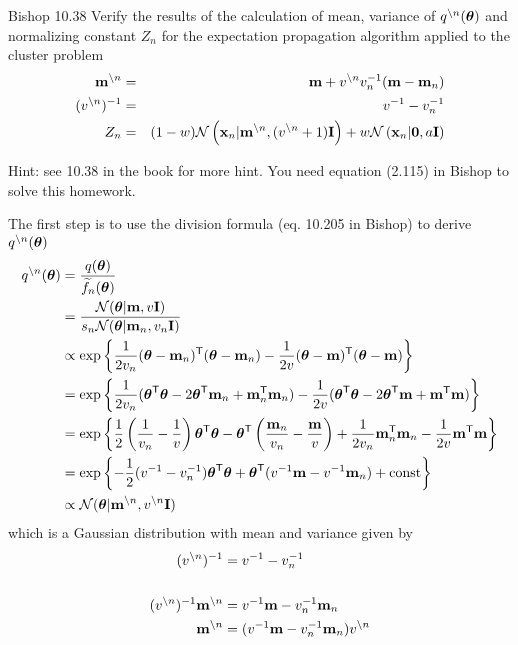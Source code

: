 \documentclass{amsmlaj}
\begin{document}
\begin{extraproblem}\textsf{Bishop 10.38}
Verify the results of the calculation of mean, variance of $q^{\backslash n}(\bm{\mathbf{\theta}})$ and normalizing constant $Z_n$ for the expectation propagation algorithm applied to the cluster problem
\begin{eqnarray}
\bm{\mathbf{m}}^{\backslash n} & = & \bm{\mathbf{m}} + v^{\backslash n}v_n^{-1}(\bm{\mathbf{m}}-\bm{\mathbf{m}}_n)\\
(v^{\backslash n})^{-1} & = & v^{-1} - v_n^{-1}\\
Z_n & = & (1-w)\mathcal{N}\left(\bm{\mathbf{x}}_n|\bm{\mathbf{m}}^{\backslash n}, (v^{\backslash n}+1)\bm{\mathbf{I}}\right) + w\mathcal{N}\left(\bm{\mathbf{x}}_n|\bm{\mathbf{0}},a\bm{\mathbf{I}}\right)
\end{eqnarray}

Hint: see 10.38 in the book for more hint. You need equation (2.115) in Bishop to solve this homework.

\begin{sol}
	The first step is to use the division formula (eq. 10.205 in Bishop) to derive
	$q^{\setminus n}(\bm{\mathbf{\theta}})$
	\begin{align}
		q^{\setminus n}(\bm{\mathbf{\theta}})
		&=\frac{q(\bm{\mathbf{\theta}})}{\widetilde{f}_n(\bm{\mathbf{\theta}})} \\
		&=\frac{\mathcal{N}(\bm{\mathbf{\theta}}|\bm{\mathbf{m}},v\bm{\mathbf{I}})}{s_n\mathcal{N}(\bm{\mathbf{\theta}}|\bm{\mathbf{m}}_n,v_n\bm{\mathbf{I}})} \\
		&\propto \exp \left\{
			\frac{1}{2v_n}(\bm{\mathbf{\theta}}-\bm{\mathbf{m}}_n)^{\mathsf{T}}(\bm{\mathbf{\theta}}-\bm{\mathbf{m}}_n)
			-\frac{1}{2v}(\bm{\mathbf{\theta}}-\bm{\mathbf{m}})^{\mathsf{T}}(\bm{\mathbf{\theta}}-\bm{\mathbf{m}})
		\right\} \\
		&= \exp \left\{
			\frac{1}{2v_n}(\bm{\mathbf{\theta}}^{\mathsf{T}}\bm{\mathbf{\theta}}-2\bm{\mathbf{\theta}}^{\mathsf{T}}\bm{\mathbf{m}}_n+\bm{\mathbf{m}}_n^{\mathsf{T}}\bm{\mathbf{m}}_n)
			-\frac{1}{2v}(\bm{\mathbf{\theta}}^{\mathsf{T}}\bm{\mathbf{\theta}}-2\bm{\mathbf{\theta}}^{\mathsf{T}}\bm{\mathbf{m}}+\bm{\mathbf{m}}^{\mathsf{T}}\bm{\mathbf{m}})
		\right\} \\
		&= \exp \left\{
			\frac{1}{2}\left(\frac{1}{v_n}-\frac{1}{v}\right)\bm{\mathbf{\theta}}^{\mathsf{T}}\bm{\mathbf{\theta}}
			-\bm{\mathbf{\theta}}^{\mathsf{T}}\left( \frac{\bm{\mathbf{m}}_n}{v_n}-\frac{\bm{\mathbf{m}}}{v} \right)
			+\frac{1}{2v_n}\bm{\mathbf{m}}_n^{\mathsf{T}}\bm{\mathbf{m}}_n
			-\frac{1}{2v}\bm{\mathbf{m}}^{\mathsf{T}}\bm{\mathbf{m}}
		\right\} \\
		&= \exp \left\{
			-\frac{1}{2}(v^{-1}-v_n^{-1})\bm{\mathbf{\theta}}^{\mathsf{T}}\bm{\mathbf{\theta}}
			+\bm{\mathbf{\theta}}^{\mathsf{T}}(v^{-1}\bm{\mathbf{m}}-v^{-1}\bm{\mathbf{m}}_n)
			+ \text{const}
		\right\} \\
		&\propto \mathcal{N}(\bm{\mathbf{\theta}}|\bm{\mathbf{m}}^{\setminus n},v^{\setminus n}\bm{\mathbf{I}})
	\end{align}
	which is a Gaussian distribution with mean and variance given by
	\begin{align}
		(v^{\setminus n})^{-1}&=v^{-1}-v_n^{-1} \\
		&\nonumber\\
		(v^{\setminus n})^{-1}\bm{\mathbf{m}}^{\setminus n}
		&=v^{-1}\bm{\mathbf{m}}-v_n^{-1}\bm{\mathbf{m}}_n \\
		\bm{\mathbf{m}}^{\setminus n}
		&=(v^{-1}\bm{\mathbf{m}}-v_n^{-1}\bm{\mathbf{m}}_n) v^{\setminus n}
	\end{align}


\end{sol}
\end{extraproblem}
\end{document}

